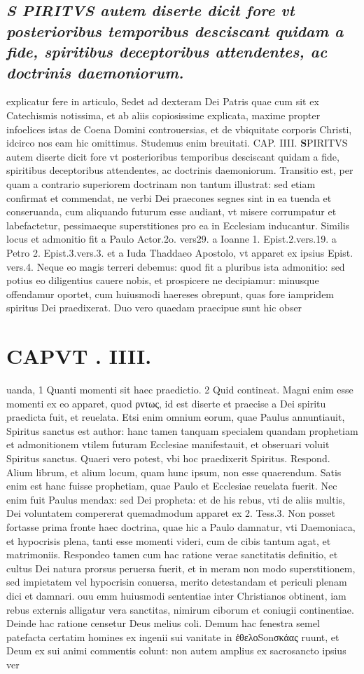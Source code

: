 \documentclass{article}
\begin{document}
\begin{pages}
\subsection*{\textit{S PIRITVS autem diserte dicit fore vt posterioribus temporibus desciscant quidam a fide, spiritibus deceptoribus attendentes, ac doctrinis daemoniorum.}}explicatur fere in articulo, Sedet ad dexteram Dei Patris quae cum sit ex Catechismis notissima, et ab aliis copiosissime explicata, maxime propter infoelices istas de Coena Domini controuersias, et de vbiquitate corporis Christi, idcirco nos eam hic omittimus. Studemus enim breuitati. CAP. IIII. 
\textbf{S}PIRITVS autem diserte dicit fore vt posterioribus temporibus desciscant quidam a fide, spiritibus deceptoribus attendentes, ac doctrinis daemoniorum. Transitio est, per quam a contrario superiorem doctrinam non tantum illustrat: sed etiam confirmat et commendat, ne verbi Dei praecones segnes sint in ea tuenda et conseruanda, cum aliquando futurum esse audiant, vt misere corrumpatur et labefactetur, pessimaeque superstitiones pro ea in Ecclesiam inducantur. Similis locus et admonitio fit a Paulo Actor.2o. vers29. a Ioanne 1. Epist.2.vers.19. a Petro 2. Epist.3.vers.3. et a Iuda Thaddaeo Apostolo, vt apparet ex ipsius Epist. vers.4. Neque eo magis terreri debemus: quod fit a pluribus ista admonitio: sed potius eo diligentius cauere nobis, et prospicere ne decipiamur: minusque offendamur oportet, cum huiusmodi haereses obrepunt, quas fore iampridem spiritus Dei praedixerat. Duo vero quaedam praecipue sunt hic obser\pend
\section*{CAPVT . IIII. }
\marginpar{[ p.181 ]}\pstart uanda, 1 Quanti momenti sit haec praedictio. 2 Quid contineat. Magni enim esse momenti ex eo apparet, quod ρντως, id est diserte et praecise a Dei spiritu praedicta fuit, et reuelata. Etsi enim omnium eorum, quae Paulus annuntiauit, Spiritus sanctus est author: hanc tamen tanquam specialem quandam prophetiam et admonitionem vtilem futuram Ecclesiae manifestauit, et obseruari voluit Spiritus sanctus. Quaeri vero potest, vbi hoc praedixerit Spiritus. Respond. Alium librum, et alium locum, quam hunc ipsum, non esse quaerendum. Satis enim est hanc fuisse prophetiam, quae Paulo et Ecclesiae reuelata fuerit. Nec enim fuit Paulus mendax: sed Dei propheta: et de his rebus, vti de aliis multis, Dei voluntatem compererat quemadmodum apparet ex 2. Tess.3. Non posset fortasse prima fronte haec doctrina, quae hic a Paulo damnatur, vti Daemoniaca, et hypocrisis plena, tanti esse momenti videri, cum de cibis tantum agat, et matrimoniis. Respondeo tamen cum hac ratione verae sanctitatis definitio, et cultus Dei natura prorsus peruersa fuerit, et in meram non modo superstitionem, sed impietatem vel hypocrisin conuersa, merito detestandam et periculi plenam dici et damnari. ouu emm huiusmodi sententiae inter Christianos obtinent, iam rebus externis alligatur vera sanctitas, nimirum ciborum et coniugii continentiae. Deinde hac ratione censetur Deus melius coli. Demum hac fenestra semel patefacta certatim homines ex ingenii sui vanitate in ἐθελοSonσκάας ruunt, et Deum ex sui animi commentis colunt: non autem amplius ex sacrosancto ipsius ver\pend

\end{pages}
\end{document}
